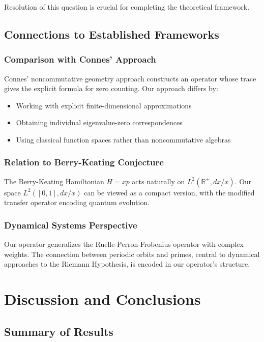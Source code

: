 \documentclass[12pt,letterpaper]{article}
\theoremstyle{plain}
\theoremstyle{definition}
\theoremstyle{remark}
\newcommand{\R}{\mathbb{R}}
\begin{document}
Resolution of this question is crucial for completing the theoretical framework.

\subsection{Connections to Established Frameworks}

\subsubsection{Comparison with Connes' Approach}

Connes' noncommutative geometry approach constructs an operator whose trace gives the explicit formula for zero counting. Our approach differs by:
\begin{itemize}
\item Working with explicit finite-dimensional approximations
\item Obtaining individual eigenvalue-zero correspondences
\item Using classical function spaces rather than noncommutative algebras
\end{itemize}

\subsubsection{Relation to Berry-Keating Conjecture}

The Berry-Keating Hamiltonian $H = xp$ acts naturally on $L^2(\R^+, dx/x)$. Our space $L^2([0,1], dx/x)$ can be viewed as a compact version, with the modified transfer operator encoding quantum evolution.

\subsubsection{Dynamical Systems Perspective}

Our operator generalizes the Ruelle-Perron-Frobenius operator with complex weights. The connection between periodic orbits and primes, central to dynamical approaches to the Riemann Hypothesis, is encoded in our operator's structure.

\section{Discussion and Conclusions}

\subsection{Summary of Results}
\end{document}
